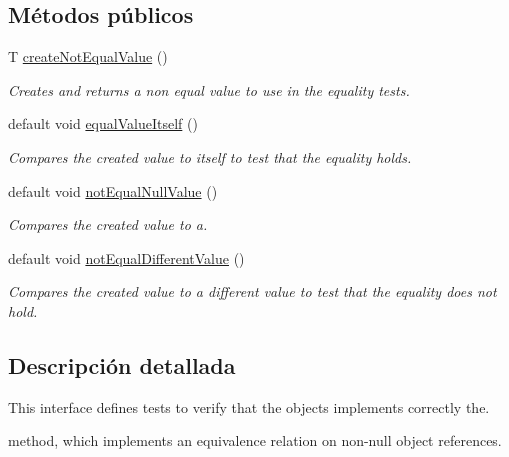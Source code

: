 \subsection*{Métodos públicos}
\begin{DoxyCompactItemize}
\item 
T \mbox{\hyperlink{interfacecom_1_1ruralhousejsf_1_1contract_1_1_equals_contract_a65840509b57f6b89e42e2abf1978aa01}{create\+Not\+Equal\+Value}} ()
\begin{DoxyCompactList}\small\item\em Creates and returns a non equal value to use in the equality tests. \end{DoxyCompactList}\item 
default void \mbox{\hyperlink{interfacecom_1_1ruralhousejsf_1_1contract_1_1_equals_contract_a5daf9e73e1147c8765c0fcf3d3dddbb0}{equal\+Value\+Itself}} ()
\begin{DoxyCompactList}\small\item\em Compares the created value to itself to test that the equality holds. \end{DoxyCompactList}\item 
default void \mbox{\hyperlink{interfacecom_1_1ruralhousejsf_1_1contract_1_1_equals_contract_adda6a50dc1babeb3783fd92a09aac788}{not\+Equal\+Null\+Value}} ()
\begin{DoxyCompactList}\small\item\em Compares the created value to a. \end{DoxyCompactList}\item 
default void \mbox{\hyperlink{interfacecom_1_1ruralhousejsf_1_1contract_1_1_equals_contract_acaa5c1c071bf63a3e629977c73131fc8}{not\+Equal\+Different\+Value}} ()
\begin{DoxyCompactList}\small\item\em Compares the created value to a different value to test that the equality does not hold. \end{DoxyCompactList}\end{DoxyCompactItemize}


\subsection{Descripción detallada}
This interface defines tests to verify that the objects implements correctly the. 


\begin{DoxyCode}{0}
\end{DoxyCode}
 method, which implements an equivalence relation on non-\/null object references. 

